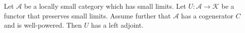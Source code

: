 Let $\mathcal{A}$ be a locally small category which has small limits. Let $U: \mathcal{A} \longrightarrow \mathcal{K}$ be a functor that preserves small limits. Assume further that $\mathcal{A}$ has a cogenerator $C$ and is well-powered. Then $U$ has a left adjoint.
